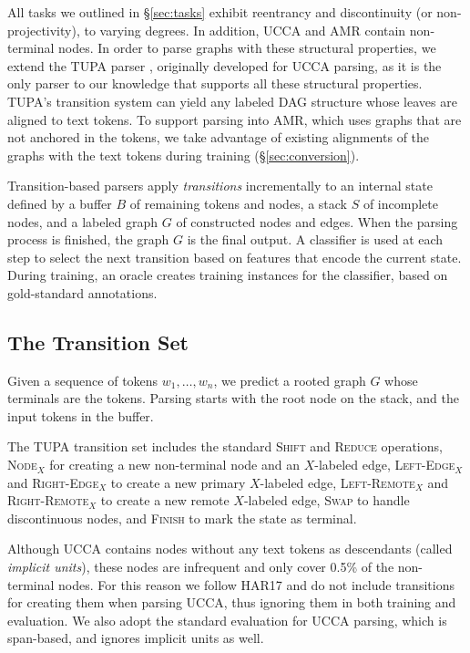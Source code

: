 \documentclass[11pt,a4paper]{article}
\begin{document}
All tasks we outlined in \S\ref{sec:tasks} exhibit
reentrancy and discontinuity (or non-projectivity), to varying degrees.
In addition, UCCA and AMR contain non-terminal nodes.
In order to parse graphs with these structural properties,
we extend the TUPA parser \cite[][henceforth HAR17]{hershcovich2017a}, 
originally developed for UCCA parsing,
as it is the only parser to our knowledge that supports 
all these structural properties.
TUPA's transition system can yield any labeled DAG structure
whose leaves are aligned to text tokens.
To support parsing into AMR, which uses graphs that are not anchored in the tokens,
 we take advantage of existing alignments of the graphs with the text
tokens during training (\S\ref{sec:conversion}).

Transition-based parsers \cite{Nivre03anefficient} apply \textit{transitions}
incrementally to an internal state defined by a buffer $B$ of remaining tokens 
and nodes, a stack $S$ of incomplete nodes, and a labeled graph $G$ of 
constructed nodes and edges.
When the parsing process is finished, the graph $G$ is the final output.
A classifier is used at each step to select the next transition based on features
that encode the current state.
During training, an oracle creates training instances for the classifier,
based on gold-standard annotations.


\subsection{The Transition Set}\label{sec:transition_set}

Given a sequence of tokens $w_1, \ldots, w_n$,
we predict a rooted graph $G$ whose terminals are the tokens.
Parsing starts with the root node on the stack,
and the input tokens in the buffer.

The TUPA transition set includes
the standard \textsc{Shift} and \textsc{Reduce} operations,
\textsc{Node$_X$} for creating a new non-terminal node and an $X$-labeled edge,
\textsc{Left-Edge$_X$} and \textsc{Right-Edge$_X$} to create a new primary $X$-labeled edge,
\textsc{Left-Remote$_X$} and \textsc{Right-Remote$_X$} to create a new remote $X$-labeled edge,
\textsc{Swap} to handle discontinuous nodes,
and \textsc{Finish} to mark the state as terminal.

Although UCCA contains nodes without any text tokens as descendants
(called \textit{implicit units}),
these nodes are infrequent and only cover 0.5\% of the non-terminal nodes.
For this reason we follow HAR17 and do not include
transitions for creating them when parsing UCCA,
thus ignoring them in both training and evaluation.
We also adopt the standard evaluation for UCCA parsing, which is span-based,
and ignores implicit units as well. 
\end{document}
